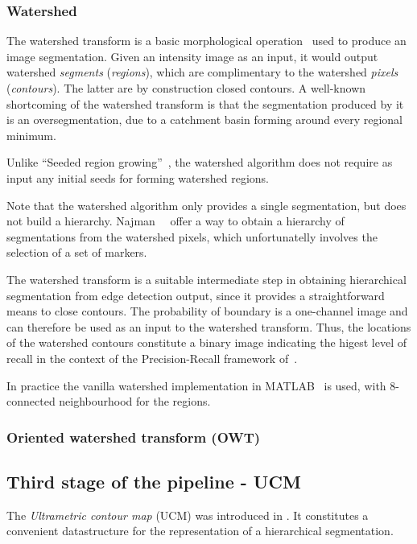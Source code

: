 \subsubsection{Watershed}
\label{sec:ch3-watershed}
The watershed transform is a basic morphological operation~\cite{beucher1992morphological} used to produce an image segmentation. Given an intensity %
image as an input, it would output watershed \textit{segments} (\textit{regions}), which are complimentary to the watershed \textit{pixels} (\textit{contours}). The latter are by construction closed contours. A well-known shortcoming of the watershed transform is that the 
segmentation produced by it is an oversegmentation, due to a catchment basin forming around every regional minimum.

Unlike ``Seeded region growing''~\cite{adams1994seeded}, the watershed algorithm does not require as input any initial seeds for forming watershed regions.

Note that the watershed algorithm only provides a single segmentation, but does not build a hierarchy. %
Najman~\etal~\cite{najman1996geodesic} offer a way to obtain a hierarchy of segmentations from the watershed pixels, which unfortunatelly involves the selection of a set of markers.

The watershed transform is a suitable intermediate step in obtaining hierarchical segmentation from edge detection output, since it provides a straightforward means to close contours. The probability of boundary is a one-channel image and can therefore be used as an input to the watershed transform. Thus, the locations of the watershed contours constitute a binary image indicating the higest level of recall in the context of the Precision-Recall framework of~\cite{Arbelaez11}. %

In practice the vanilla watershed implementation in MATLAB~\cite{MATLABwatershed} is used, with 8-connected neighbourhood for the regions.

\subsubsection{Oriented watershed transform (OWT)}
\label{sec:ch3-OWT}

\subsection{Third stage of the pipeline - UCM}
\label{sec:ch3-UCM}
The {\it Ultrametric contour map} (UCM) was introduced in \cite{Arbelaez2006boundary}. It constitutes a convenient datastructure for the representation of a hierarchical segmentation. 


